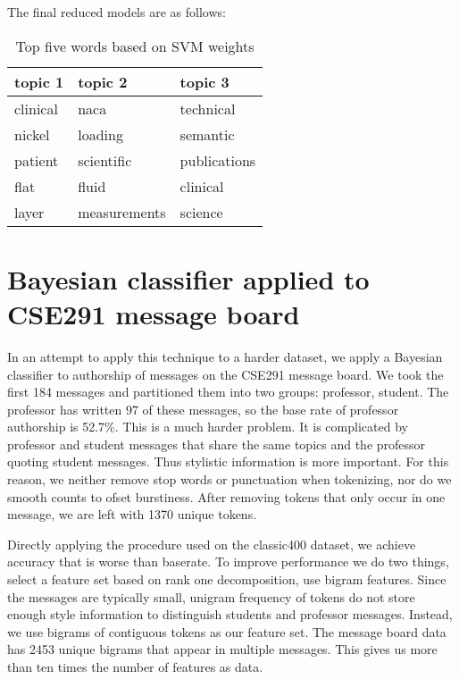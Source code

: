 \documentclass[fullpage]{article}
\begin{document}
The final reduced models are as follows:

\begin{table}[h]
\begin{center}
\begin{tabular}{| l | l | l |}
topic 1 & topic 2 & topic 3 \\
\hline
clinical &naca & technical\\
nickel &loading &semantic \\
patient &scientific &publications \\
flat &fluid & clinical\\
layer &measurements &science \\
\end{tabular}
\caption{Top five words based on SVM weights}
\end{center}
\end{table}

\section{Bayesian classifier applied to CSE291 message board}
In an attempt to apply this technique to a harder dataset, we apply a Bayesian classifier to authorship of messages on the CSE291 message board.  We took the first 184 messages and partitioned them into two groups: professor, student. The professor has written 97 of these messages, so the base rate of professor authorship is 52.7\%.
This is a much harder problem. It is complicated by professor and student messages that share the same topics and the professor quoting student messages. Thus stylistic information is more important.  For this reason, we neither remove stop words or punctuation when tokenizing, nor do we smooth counts to ofset burstiness. After removing tokens that only occur in one message, we are left with 1370 unique tokens. 

Directly applying the procedure used on the classic400 dataset, we achieve accuracy that is worse than baserate.  To improve performance we do two things, select a feature set based on rank one decomposition, use bigram features.
Since the messages are typically small, unigram frequency of tokens do not store enough style information to distinguish students and professor messages. Instead, we use bigrams of contiguous tokens as our feature set.  The message board data has 2453 unique bigrams that appear in multiple messages.  This gives us more than ten times the number of features as data.
\end{document}
